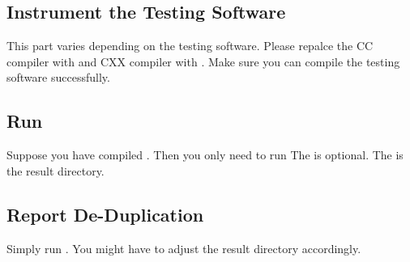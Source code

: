 \begin{appendices}
\subsection{Instrument the Testing Software}
This part varies depending on the testing software.
%
Please repalce the CC compiler with  and CXX compiler with .
%
Make sure you can compile the testing software successfully.

\subsection{Run \sys}
Suppose you have compiled .
Then you only need to run 
The  is optional.
%
The  is the result directory.

\subsection{Report De-Duplication}
Simply run .
You might have to adjust the result directory accordingly.
\end{appendices}
